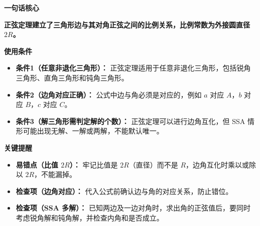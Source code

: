\begin{summarybox}
	\textbf{\textcolor{CSummary}{一句话核心}}

	\textbf{正弦定理建立了三角形边与其对角正弦之间的比例关系，比例常数为外接圆直径 $2R$。}

	\medskip
	\textbf{\textcolor{CSummary}{使用条件}}
	\begin{itemize}[leftmargin=*, itemsep=0.5em, topsep=0.4em]
		\item \textbf{条件1（任意非退化三角形）：} 正弦定理适用于任意非退化三角形，包括锐角三角形、直角三角形和钝角三角形。
		\item \textbf{条件2（边角对应正确）：} 公式中边与角必须是对应的，例如 $a$ 对应 $A$，$b$ 对应 $B$，$c$ 对应 $C$。
		\item \textbf{条件3（解三角形需判定解的个数）：} 正弦定理可以进行边角互化，但 SSA 情形可能出现无解、一解或两解，不能默认唯一。
	\end{itemize}

	\medskip
	\textbf{\textcolor{CSummary}{关键提醒}}
	\begin{itemize}[leftmargin=*, itemsep=0.5em, topsep=0.4em]
		\item \textbf{易错点（比值 $2R$）：} 牢记比值是 $2R$（直径）而不是 $R$，边角互化时乘以或除以 $2R$，不能漏掉。
		\item \textbf{检查项（边角对应）：} 代入公式前确认边与角的对应关系，防止错位。
		\item \textbf{检查项（SSA 多解）：} 已知两边及一边对角时，求出角的正弦值后，要同时考虑锐角解和钝角解，并检查内角和是否成立。
	\end{itemize}
\end{summarybox}